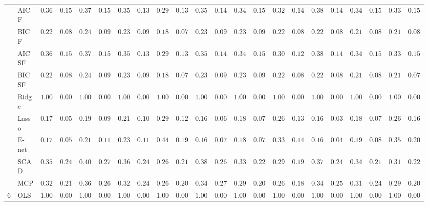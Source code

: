 \begin{tabular}{p{0.2cm}p{1cm}|p{0.6cm}p{0.6cm}|p{0.6cm}p{0.6cm}p{0.6cm}p{0.6cm}p{0.6cm}p{0.6cm}|p{0.6cm}p{0.6cm}p{0.6cm}p{0.6cm}p{0.6cm}p{0.6cm}|p{0.6cm}p{0.6cm}p{0.6cm}p{0.6cm}p{0.6cm}p{0.6cm}}
 & AIC F  & $0.3633$ & $0.1560$ & $0.3767$ & $0.1565$ & $0.3550$ & $0.1374$ & $0.2933$ & $0.1384$ & $0.3583$ & $0.1486$ & $0.3467$ & $0.1529$ & $0.3233$ & $0.1476$ & $0.3883$ & $0.1499$ & $0.3450$ & $0.1522$ & $0.3333$ & $0.1517$ \\
 & BIC F  & $0.2217$ & $0.0856$ & $0.2417$ & $0.0929$ & $0.2333$ & $0.0977$ & $0.1867$ & $0.0722$ & $0.2367$ & $0.0953$ & $0.2333$ & $0.0977$ & $0.2267$ & $0.0871$ & $0.2233$ & $0.0828$ & $0.2100$ & $0.0808$ & $0.2167$ & $0.0803$ \\
 & AIC SF  & $0.3633$ & $0.1560$ & $0.3767$ & $0.1565$ & $0.3550$ & $0.1374$ & $0.2933$ & $0.1384$ & $0.3583$ & $0.1486$ & $0.3450$ & $0.1522$ & $0.3083$ & $0.1284$ & $0.3867$ & $0.1458$ & $0.3450$ & $0.1522$ & $0.3333$ & $0.1517$ \\
 & BIC SF  & $0.2217$ & $0.0856$ & $0.2417$ & $0.0929$ & $0.2333$ & $0.0977$ & $0.1867$ & $0.0722$ & $0.2367$ & $0.0953$ & $0.2317$ & $0.0974$ & $0.2267$ & $0.0871$ & $0.2233$ & $0.0828$ & $0.2100$ & $0.0808$ & $0.2150$ & $0.0796$ \\
 & Ridge  & $1.0000$ & $0.0000$ & $1.0000$ & $0.0000$ & $1.0000$ & $0.0000$ & $1.0000$ & $0.0000$ & $1.0000$ & $0.0000$ & $1.0000$ & $0.0000$ & $1.0000$ & $0.0000$ & $1.0000$ & $0.0000$ & $1.0000$ & $0.0000$ & $1.0000$ & $0.0000$ \\
 & Lasso  & $0.1733$ & $0.0576$ & $0.1917$ & $0.0929$ & $0.2167$ & $0.1019$ & $0.2917$ & $0.1239$ & $0.1633$ & $0.0669$ & $0.1850$ & $0.0745$ & $0.2667$ & $0.1319$ & $0.1650$ & $0.0374$ & $0.1883$ & $0.0773$ & $0.2683$ & $0.1673$ \\
 & E-net  & $0.1733$ & $0.0576$ & $0.2117$ & $0.1132$ & $0.2383$ & $0.1118$ & $0.4483$ & $0.1905$ & $0.1683$ & $0.0730$ & $0.1850$ & $0.0745$ & $0.3333$ & $0.1460$ & $0.1667$ & $0.0474$ & $0.1967$ & $0.0898$ & $0.3500$ & $0.2017$ \\
 & SCAD  & $0.3583$ & $0.2466$ & $0.4067$ & $0.2715$ & $0.3667$ & $0.2496$ & $0.2683$ & $0.2144$ & $0.3817$ & $0.2641$ & $0.3383$ & $0.2215$ & $0.2900$ & $0.1962$ & $0.3717$ & $0.2437$ & $0.3433$ & $0.2195$ & $0.3183$ & $0.2273$ \\
 & MCP  & $0.3217$ & $0.2187$ & $0.3683$ & $0.2641$ & $0.3200$ & $0.2400$ & $0.2600$ & $0.2083$ & $0.3483$ & $0.2733$ & $0.2967$ & $0.2018$ & $0.2650$ & $0.1852$ & $0.3417$ & $0.2544$ & $0.3100$ & $0.2451$ & $0.2900$ & $0.2046$ \\\hline
6 & OLS  & $1.0000$ & $0.0000$ & $1.0000$ & $0.0000$ & $1.0000$ & $0.0000$ & $1.0000$ & $0.0000$ & $1.0000$ & $0.0000$ & $1.0000$ & $0.0000$ & $1.0000$ & $0.0000$ & $1.0000$ & $0.0000$ & $1.0000$ & $0.0000$ & $1.0000$ & $0.0000$ \\

\end{tabular}
